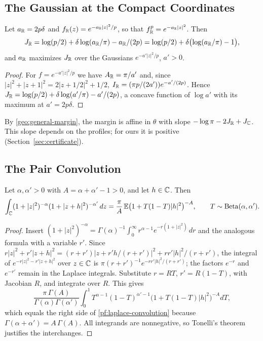 \subsection{The Gaussian at the Compact Coordinates}

\begin{lemma}\label{pf:gaussian}
Let $a_\mathbb R=2p\delta$ and $f_\mathbb R(z)=e^{-a_\mathbb R|z|^2/p}$, so that
$f_\mathbb R^p=e^{-a_\mathbb R|z|^2}$. Then
\begin{equation}\label{pf:gaussian-compact}
 J_\mathbb R=\log(p/2)+\delta\log(a_\mathbb R/\pi)-a_\mathbb R/(2p)
 =\log(p/2)+\delta\bigl(\log(a_\mathbb R/\pi)-1\bigr),
\end{equation}
and $a_\mathbb R$ maximizes $J_\mathbb R$ over the Gaussians $e^{-a'|z|^2/p}$, $a'>0$.
\end{lemma}

\begin{proof}
For $f=e^{-a'|z|^2/p}$ we have $A_\mathbb R=\pi/a'$ and, since
$|z|^2+|z+1|^2=2|z+1/2|^2+1/2$, $I_\mathbb R=(\pi p/(2a'))e^{-a'/(2p)}$. Hence
$J_\mathbb R=\log(p/2)+\delta\log(a'/\pi)-a'/(2p)$, a concave function of
$\log a'$ with its maximum at $a'=2p\delta$.
\end{proof}

By \eqref{geo:general-margin}, the margin is affine in $\theta$ with
slope $-\log\pi-2J_\mathbb R+J_\mathbb C$. This slope depends on the profiles; for
ours it is positive (Section~\ref{sec:certificate}).

\subsection{The Pair Convolution}

\begin{lemma}\label{pf:laplace}
Let $\alpha,\alpha'>0$ with $A=\alpha+\alpha'-1>0$, and let $h\in\mathbb C$.
Then
\begin{equation}\label{pf:laplace-convolution}
 \int_{\mathbb C}(1+|z|^2)^{-\alpha}(1+|z+h|^2)^{-\alpha'}\,dz
 =\frac\pi A\,\mathbb E\bigl(1+T(1-T)|h|^2\bigr)^{-A},
 \qquad T\sim\mathrm{Beta}(\alpha,\alpha').
\end{equation}
\end{lemma}

\begin{proof}
Insert
$(1+|z|^2)^{-\alpha}=\Gamma(\alpha)^{-1}\int_0^\infty
r^{\alpha-1}e^{-r(1+|z|^2)}\,dr$ and the analogous formula with a
variable $r'$. Since
$r|z|^2+r'|z+h|^2=(r+r')|z+r'h/(r+r')|^2+rr'|h|^2/(r+r')$, the
integral of $e^{-r|z|^2-r'|z+h|^2}$ over $z\in\mathbb C$ is
$\pi(r+r')^{-1}e^{-rr'|h|^2/(r+r')}$; the factors $e^{-r}$ and
$e^{-r'}$ remain in the Laplace integrals. Substitute $r=RT$,
$r'=R(1-T)$, with Jacobian $R$, and integrate over $R$. This gives
\[
 \frac{\pi\,\Gamma(A)}{\Gamma(\alpha)\Gamma(\alpha')}
 \int_0^1T^{\alpha-1}(1-T)^{\alpha'-1}\bigl(1+T(1-T)|h|^2\bigr)^{-A}dT,
\]
which equals the right side of \eqref{pf:laplace-convolution} because
$\Gamma(\alpha+\alpha')=A\,\Gamma(A)$. All integrands are nonnegative,
so Tonelli's theorem justifies the interchanges.
\end{proof}

